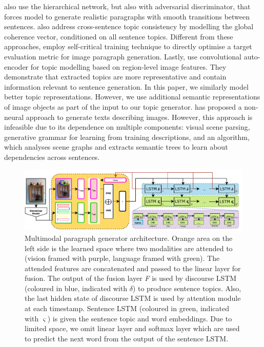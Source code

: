 \documentclass[11pt,a4paper]{article}
\begin{document}

 also use the hierarchical network, but also with adversarial discriminator, that forces model to generate realistic paragraphs with smooth transitions between sentences.
 also address cross-sentence topic consistency by modelling the global coherence vector, conditioned on all sentence topics.
Different from these approaches,  employ self-critical training technique \cite{selfcritical2016} to directly optimise a target evaluation metric for image paragraph generation.
Lastly,  use convolutional auto-encoder for topic modelling based on region-level image features.
They demonstrate that extracted topics are more representative and contain information relevant to sentence generation.
In this paper, we similarly model better topic representations.
However, we use additional semantic representations of image objects as part of the input to our topic generator.
 has proposed a non-neural approach to generate texts describing images.
However, this approach is infeasible due to its dependence on multiple components: visual scene parsing, generative grammar for learning from training descriptions, and an algorithm, which analyses scene graphs and extracts semantic trees to learn about dependencies across sentences.

\begin{figure}[h!]
 \includegraphics[width=\linewidth]{figures/model}
 \caption{Multimodal paragraph generator architecture.
 		Orange area on the left side is the learned space where two modalities are attended to (vision framed with purple, language framed with green).
		The attended features are concatenated and passed to the linear layer for fusion.
		The output of the fusion layer \textit{F} is used by discourse LSTM (coloured in blue, indicated with $\delta$) to produce sentence topics.
		Also, the last hidden state of discourse LSTM is used by attention module at each timestamp.
		Sentence LSTM (coloured in green, indicated with $\varsigma$) is given the sentence topic and word embeddings.
		Due to limited space, we omit linear layer and softmax layer which are used to predict the next word from the output of the sentence LSTM.}
 \label{fig:model}
\end{figure}
\end{document}
